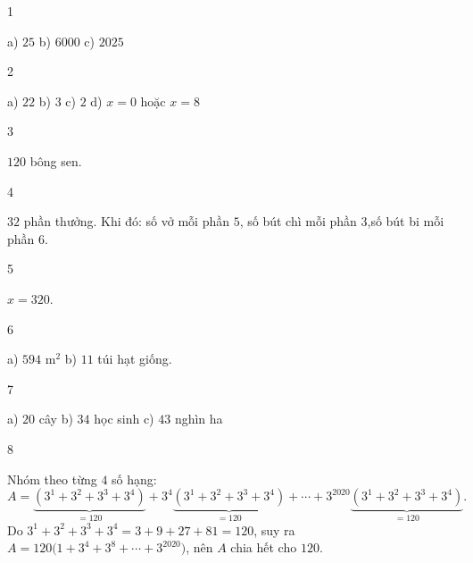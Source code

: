 \begin{Solbook}{1}
 \par \noindent a) $25$ \hfill b) $6000$ \hfill c) $2025$ \hfill \qedEX 
\end{Solbook}
\begin{Solbook}{2}
 \par \noindent a) $22$ \hfill b) $3$ \hfill c) $2$ \hfill d) $x=0$ hoặc $x=8$ \hfill \qedEX 
\end{Solbook}
\begin{Solbook}{3}
 \par \noindent $120$ bông sen. \hfill \qedEX 
\end{Solbook}
\begin{Solbook}{4}
 \par \noindent $32$ phần thưởng. Khi đó: số vở mỗi phần $5$, số bút chì mỗi phần $3$,số bút bi mỗi phần $6$.  \hfill \qedEX 
\end{Solbook}
\begin{Solbook}{5}
 \par \noindent  $x=320$.  \hfill \qedEX 
\end{Solbook}
\begin{Solbook}{6}
 \par \noindent a) $594$ m$^2$ \hfill b) $11$ túi hạt giống. \hfill \qedEX 
\end{Solbook}
\begin{Solbook}{7}
 \par \noindent a) $20$ cây \hfill b) $34$ học sinh \hfill c) $43$ nghìn ha \hfill \qedEX 
\end{Solbook}
\begin{Solbook}{8}
 \par \noindent  Nhóm theo từng $4$ số hạng: \[ A=\underbrace {(3^1+3^2+3^3+3^4)}_{=120} +3^4\underbrace {(3^1+3^2+3^3+3^4)}_{=120} +\cdots +3^{2020}\underbrace {(3^1+3^2+3^3+3^4)}_{=120}. \] Do $3^1+3^2+3^3+3^4=3+9+27+81=120$, suy ra $A=120\bigl (1+3^4+3^8+\cdots +3^{2020}\bigr )$, nên $A$ chia hết cho $120$.  \hfill \qedEX 
\end{Solbook}
